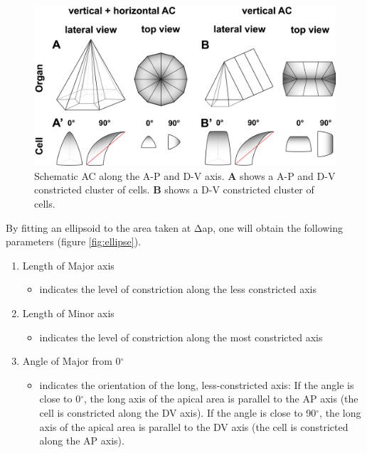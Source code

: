 \documentclass[11pt,singlespacinge,twoside]{reedthesis} %
\providecommand{\tightlist}{%
  \setlength{\itemsep}{0pt}\setlength{\parskip}{0pt}}
\theoremstyle{definition}
\theoremstyle{definition}
\theoremstyle{definition}
\theoremstyle{remark}
\begin{document}
\begin{figure}[H]

{\centering \includegraphics[width=0.75\linewidth]{figures/materials/models/ACI_Cells_pol} 

}

\caption[Schematic anisotropic AC]{Schematic AC along the A-P and D-V axis. \textbf{A} shows a A-P and D-V constricted cluster of cells. \textbf{B} shows a D-V constricted cluster of cells.}\label{fig:cellpol}
\end{figure}
\noindent By fitting an ellipsoid to the area taken at \(\mathrm{\Delta}\)ap, one will obtain the following parameters (figure \ref{fig:ellipse}).
\begin{enumerate}
\def\labelenumi{\arabic{enumi}.}
\tightlist
\item
  Length of Major axis
  \begin{itemize}
  \tightlist
  \item
    indicates the level of constriction along the less constricted axis
  \end{itemize}
\item
  Length of Minor axis
  \begin{itemize}
  \tightlist
  \item
    indicates the level of constriction along the most constricted axis
  \end{itemize}
\item
  Angle of Major from 0\(^\circ\)
  \begin{itemize}
  \tightlist
  \item
    indicates the orientation of the long, less-constricted axis: If the angle is close to 0\(^\circ\), the long axis of the apical area is parallel to the AP axis (the cell is constricted along the DV axis). If the angle is close to 90\(^\circ\), the long axis of the apical area is parallel to the DV axis (the cell is constricted along the AP axis).
  \end{itemize}
\end{enumerate}
\end{document}
